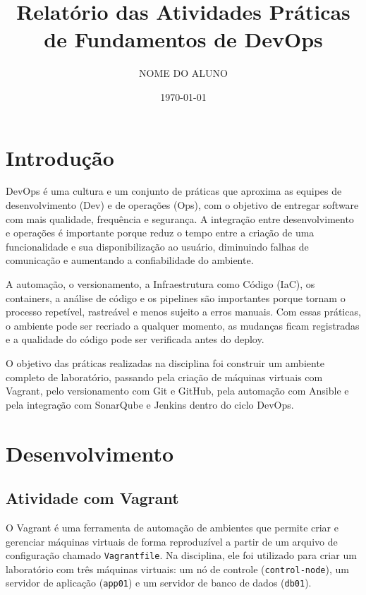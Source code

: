 \documentclass[12pt,a4paper]{article}
\title{Relat\'orio das Atividades Pr\'aticas de Fundamentos de DevOps}
\author{NOME DO ALUNO}
\date{\today}
\begin{document}
\maketitle

\tableofcontents
\newpage

\section{Introdu\c{c}\~ao}

DevOps \'e uma cultura e um conjunto de pr\'aticas que aproxima as equipes de
desenvolvimento (Dev) e de opera\c{c}\~oes (Ops), com o objetivo de entregar
software com mais qualidade, frequ\^encia e seguran\c{c}a. A integra\c{c}\~ao entre
desenvolvimento e opera\c{c}\~oes \'e importante porque reduz o tempo entre a
cria\c{c}\~ao de uma funcionalidade e sua disponibiliza\c{c}\~ao ao usu\'ario,
diminuindo falhas de comunica\c{c}\~ao e aumentando a confiabilidade do ambiente.

A automa\c{c}\~ao, o versionamento, a Infraestrutura como C\'odigo (IaC), os
containers, a an\'alise de c\'odigo e os pipelines s\~ao importantes porque tornam
o processo repet\'ivel, rastre\'avel e menos sujeito a erros manuais. Com essas
pr\'aticas, o ambiente pode ser recriado a qualquer momento, as mudan\c{c}as ficam
registradas e a qualidade do c\'odigo pode ser verificada antes do deploy.

O objetivo das pr\'aticas realizadas na disciplina foi construir um ambiente
completo de laborat\'orio, passando pela cria\c{c}\~ao de m\'aquinas virtuais com
Vagrant, pelo versionamento com Git e GitHub, pela automa\c{c}\~ao com Ansible e
pela integra\c{c}\~ao com SonarQube e Jenkins dentro do ciclo DevOps.

\section{Desenvolvimento}

\subsection{Atividade com Vagrant}

O Vagrant \'e uma ferramenta de automa\c{c}\~ao de ambientes que permite criar e
gerenciar m\'aquinas virtuais de forma reproduz\'ivel a partir de um arquivo de
configura\c{c}\~ao chamado \texttt{Vagrantfile}. Na disciplina, ele foi utilizado
para criar um laborat\'orio com tr\^es m\'aquinas virtuais: um n\'o de controle
(\texttt{control-node}), um servidor de aplica\c{c}\~ao (\texttt{app01}) e um
servidor de banco de dados (\texttt{db01}).
\end{document}
